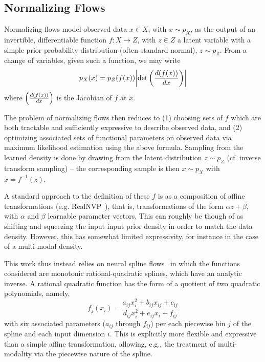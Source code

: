 \subsection{Normalizing Flows}
Normalizing flows model observed data $x\in X$, with $x \sim p_{X}$, as the output of an 
invertible, differentiable function $f: X \rightarrow Z$, with $z\in Z$ a latent 
variable with a simple prior probability distribution (often standard normal), $z\sim p_{Z}$. 
From a change of variables, given such a function, we may write
\begin{equation}
p_{X}(x) = p_{Z}(f(x))\qty|\det\qty(\frac{d(f(x))}{dx})|
\end{equation}
where $\qty(\frac{d(f(x))}{dx})$ is the Jacobian of $f$ at $x$.

The problem of normalizing flows then reduces to (1) choosing sets of $f$ which are 
both tractable and sufficiently expressive to describe observed data, and (2) optimizing 
associated sets of functional parameters on observed data via maximum likelihood estimation 
using the above formula. Sampling from the learned density is done by drawing from the 
latent distribution $z\sim p_Z$ (cf. inverse transform sampling) -- the corresponding 
sample is then $x\sim p_X$ with $x=f^{-1}(z)$.

A standard approach to the definition of these $f$ is as a composition of affine transformations (e.g. 
RealNVP~\cite{RealNVP}), 
that is, transformations of the form $\alpha z + \beta$, with $\alpha$ and $\beta$ learnable 
parameter vectors. This can roughly be though of as shifting and squeezing the input
input prior density in order to match the data density. However, this has somewhat limited expressivity, 
for instance in the case of a multi-modal density.

This work thus instead relies on neural spline flows~\cite{NeuralSplineFlows} 
in which the functions considered are monotonic rational-quadratic splines, which have an analytic inverse.
A rational quadratic function has the form of a quotient of two quadratic polynomials, namely,
\begin{equation}
f_j(x_i) = \frac{a_{ij} x_i^2 + b_{ij} x_{ij} + c_{ij}}{d_{ij}x_i^2 + e_{ij} x_i + f_{ij}}
\end{equation}
with six associated parameters ($a_{ij}$ through $f_{ij}$) per each piecewise bin $j$ of the spline and 
each input dimension $i$. This is explicitly more flexible and expressive than a simple affine 
transformation, allowing, e.g., the treatment of multi-modality via the piecewise nature of the spline. 

